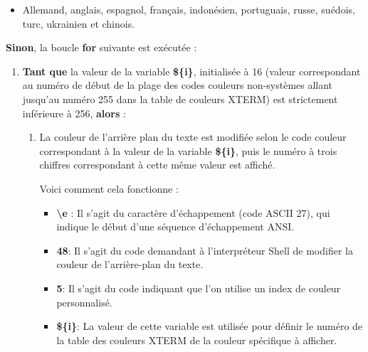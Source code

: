 \documentclass[a4paper,10pt]{article}
\begin{document}
    \begin{justify}
        \begin{itemize}
            \item Allemand, anglais, espagnol, français, indonésien, portuguais, russe, suédois, turc, ukrainien et chinois.
        \end{itemize}
    \end{justify}

    \begin{justify}
    	\textbf{\color{cond}Sinon}, la boucle \textbf{\color{loop}for} suivante est exécutée :

    	\setlength{\parskip}{.3em}

    	\begin{enumerate}
    	    \item \textbf{\color{loop}Tant que} la valeur de la variable \textbf{\color{vars}\$\{i\}}, initialisée à 16 (valeur correspondant au numéro de début de la plage des codes couleurs non-systèmes allant jusqu'au numéro 255 dans la table de couleurs XTERM) est strictement inférieure à 256, \textbf{\color{loop}alors} :

            \begin{enumerate}
                \item La couleur de l'arrière plan du texte est modifiée selon le code couleur correspondant à la valeur de la variable \textbf{\color{vars}\$\{i\}}, puis le numéro à trois chiffres correspondant à cette même valeur est affiché.

                \setlength{\parskip}{1em}

                Voici comment cela fonctionne :

                \begin{itemize}
                    \setlength{\parskip}{1em}

                    \item \textbf{\textbackslash{e}} : Il s'agit du caractère d'échappement (code ASCII 27), qui indique le début d'une séquence d'échappement ANSI.

                    \item \textbf{48}: Il s'agit du code demandant à l'interpréteur Shell de modifier la couleur de l'arrière-plan du texte.

                    \item \textbf{5}: Il s'agit du code indiquant que l'on utilise un index de couleur personnalisé.

                    \item \textbf{\color{vars}\$\{i\}}: La valeur de cette variable est utilisée pour définir le numéro de la table des couleurs XTERM de la couleur spécifique à afficher.


\end{itemize}
\end{enumerate}
\end{enumerate}
\end{justify}
\end{document}
